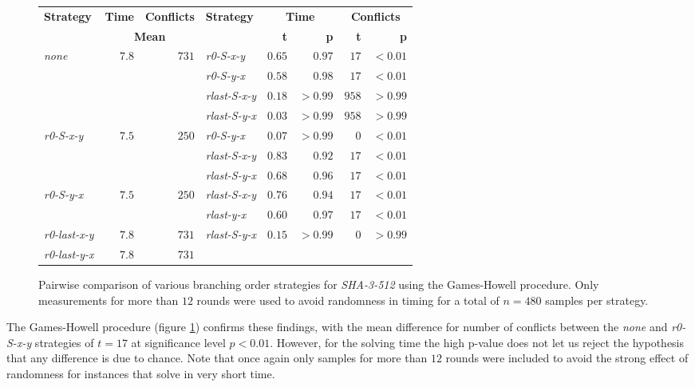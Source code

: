 \begin{figure}
\centering \begin{tabular}{lrrlrrrr}
\textbf{Strategy} & \textbf{Time} & \textbf{Conflicts} & \textbf{Strategy} & \multicolumn{2}{c}{\textbf{Time}} & \multicolumn{2}{c}{\textbf{Conflicts}} \\
& \multicolumn{2}{c}{\textbf{Mean}} & & \textbf{t} & \textbf{p} & \textbf{t} & \textbf{p} \\ \hline
\emph{none} & $7.8$ & $731$ & \emph{r0-S-x-y} & $0.65$ & $0.97$ & $17$ & $<0.01$ \\
& & & \emph{r0-S-y-x} & $0.58$ & $0.98$ & $17$ & $<0.01$ \\
& & & \emph{rlast-S-x-y} & $0.18$ & $>0.99$ & $958$ & $>0.99$ \\
& & & \emph{rlast-S-y-x} & $0.03$ & $>0.99$ & $958$ & $>0.99$ \\ \hline
\emph{r0-S-x-y} & $7.5$ & $250$ & \emph{r0-S-y-x} & $0.07$ & $>0.99$ & $0$ & $<0.01$ \\	
& & & \emph{rlast-S-x-y} & $0.83$ & $0.92$ & $17$ & $<0.01$ \\
& & & \emph{rlast-S-y-x} & $0.68$ & $0.96$ & $17$ & $<0.01$ \\ \hline
\emph{r0-S-y-x} & $7.5$ & $250$ & \emph{rlast-S-x-y} & $0.76$ & $0.94$ & $17$ & $<0.01$ \\
& & & \emph{rlast-y-x} & $0.60$ & $0.97$ & $17$ & $<0.01$ \\ \hline
\emph{r0-last-x-y} & $7.8$ & $731$ & \emph{rlast-S-y-x} & $0.15$ & $>0.99$ & $0$ & $>0.99$ \\ \hline
\emph{r0-last-y-x} & $7.8$ & $731$ & & & & &  \\
\end{tabular}
\caption{Pairwise comparison of various branching order strategies for \emph{SHA-3-512} using the Games-Howell procedure. Only measurements for more than $12$ rounds were used to avoid randomness in timing for a total of $n=480$ samples per strategy.}
\label{tbl:gh-sha3-bos}
\end{figure}

The Games-Howell procedure (figure \ref{tbl:gh-sha3-bos}) confirms these findings, with the mean difference for number of conflicts between the \emph{none} and \emph{r0-S-x-y} strategies of $t = 17$ at significance level $p < 0.01$.
However, for the solving time the high p-value does not let us reject the hypothesis that any difference is due to chance.
Note that once again only samples for more than $12$ rounds were included to avoid the strong effect of randomness for instances that solve in very short time.

